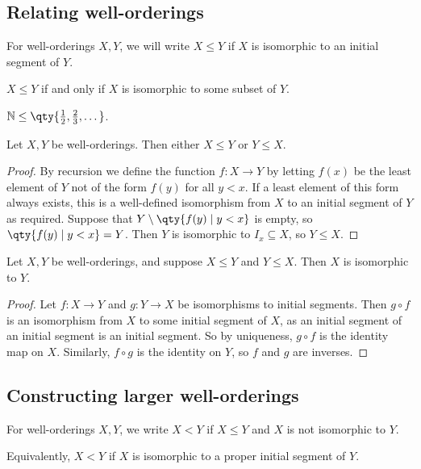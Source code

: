 \subsection{Relating well-orderings}
\begin{definition}
    For well-orderings $X, Y$, we will write $X \leq Y$ if $X$ is isomorphic to an initial segment of $Y$.
\end{definition}
$X \leq Y$ if and only if $X$ is isomorphic to some subset of $Y$.
\begin{example}
    $\mathbb N \leq \qty{\frac{1}{2}, \frac{2}{3}, \dots}$.
\end{example}
\begin{proposition}
    Let $X, Y$ be well-orderings.
    Then either $X \leq Y$ or $Y \leq X$.
\end{proposition}
\begin{proof}
    By recursion we define the function $f \colon X \to Y$ by letting $f(x)$ be the least element of $Y$ not of the form $f(y)$ for all $y < x$.
    If a least element of this form always exists, this is a well-defined isomorphism from $X$ to an initial segment of $Y$ as required.
    Suppose that $Y \setminus \qty{f(y) \mid y < x}$ is empty, so $\qty{f(y) \mid y < x} = Y$.
    Then $Y$ is isomorphic to $I_x \subseteq X$, so $Y \leq X$.
\end{proof}
\begin{proposition}
    Let $X, Y$ be well-orderings, and suppose $X \leq Y$ and $Y \leq X$.
    Then $X$ is isomorphic to $Y$.
\end{proposition}
\begin{proof}
    Let $f \colon X \to Y$ and $g \colon Y \to X$ be isomorphisms to initial segments.
    Then $g \circ f$ is an isomorphism from $X$ to some initial segment of $X$, as an initial segment of an initial segment is an initial segment.
    So by uniqueness, $g \circ f$ is the identity map on $X$.
    Similarly, $f \circ g$ is the identity on $Y$, so $f$ and $g$ are inverses.
\end{proof}

\subsection{Constructing larger well-orderings}
\begin{definition}
    For well-orderings $X, Y$, we write $X < Y$ if $X \leq Y$ and $X$ is not isomorphic to $Y$.
\end{definition}
Equivalently, $X < Y$ if $X$ is isomorphic to a proper initial segment of $Y$.

